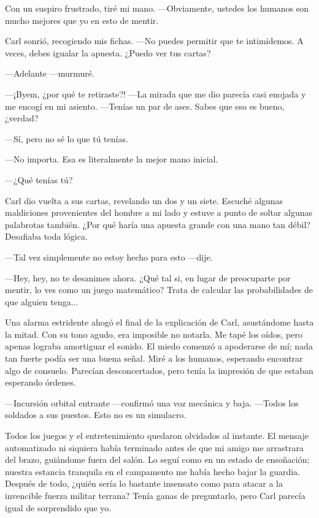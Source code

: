 \documentclass[spanish,12pt,a4paper,oneside,titlepage]{book}
\begin{document}
    Con un suspiro frustrado, tiré mi mano. —Obviamente, ustedes los humanos son mucho mejores que yo en esto de mentir.

    Carl sonrió, recogiendo mis fichas. —No puedes permitir que te intimidemos. A veces, debes igualar la apuesta. ¿Puedo ver tus cartas?

    —Adelante —murmuré.

    —¡Byem, ¿por qué te retiraste?! —La mirada que me dio parecía casi enojada y me encogí en mi asiento. —Tenías un par de ases. Sabes que eso es bueno, ¿verdad?

    —Sí, pero no sé lo que tú tenías.

    —No importa. Esa es literalmente la mejor mano inicial.

    —¿Qué tenías tú?

    Carl dio vuelta a sus cartas, revelando un dos y un siete. Escuché algunas maldiciones provenientes del hombre a mi lado y estuve a punto de soltar algunas palabrotas también. ¿Por qué haría una apuesta grande con una mano tan débil? Desafiaba toda lógica.

    —Tal vez simplemente no estoy hecho para esto —dije.

    —Hey, hey, no te desanimes ahora. ¿Qué tal si, en lugar de preocuparte por mentir, lo ves como un juego matemático? Trata de calcular las probabilidades de que alguien tenga...

    Una alarma estridente ahogó el final de la explicación de Carl, asustándome hasta la mitad. Con su tono agudo, era imposible no notarla. Me tapé los oídos, pero apenas lograba amortiguar el sonido. El miedo comenzó a apoderarse de mí; nada tan fuerte podía ser una buena señal. Miré a los humanos, esperando encontrar algo de consuelo. Parecían desconcertados, pero tenía la impresión de que estaban esperando órdenes.

    —Incursión orbital entrante —confirmó una voz mecánica y baja. —Todos los soldados a sus puestos. Esto no es un simulacro.

    Todos los juegos y el entretenimiento quedaron olvidados al instante. El mensaje automatizado ni siquiera había terminado antes de que mi amigo me arrastrara del brazo, guiándome fuera del salón. Lo seguí como en un estado de ensoñación; nuestra estancia tranquila en el campamento me había hecho bajar la guardia. Después de todo, ¿quién sería lo bastante insensato como para atacar a la invencible fuerza militar terrana? Tenía ganas de preguntarlo, pero Carl parecía igual de sorprendido que yo.
\end{document}

